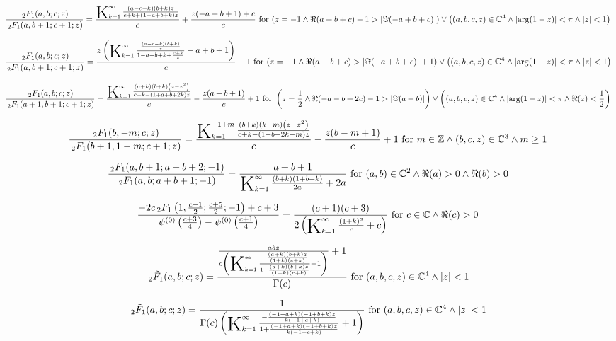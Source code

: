 \documentclass{article}
\newcommand{\bigK}{\mathop{\raisebox{-5pt}{\huge K}}}
\begin{document}
\[\frac{\, _2F_1(a,b;c;z)}{\, _2F_1(a,b+1;c+1;z)}=\frac{\bigK_{k=1}^{\infty}\frac{(a-c-k) (b+k) z}{c+k+(1-a+b+k) z}}{c}+\frac{z (-a+b+1)+c}{c}\text{ for }(z=-1\land \Re(a+b+c)-1>\left| \Im(-a+b+c)\right| )\lor \left((a,b,c,z)\in \mathbb{C}^4\land \left| \arg (1-z)\right| <\pi \land \left| z\right| <1\right)\] 

\[\frac{\, _2F_1(a,b;c;z)}{\, _2F_1(a,b+1;c+1;z)}=\frac{z \left(\bigK_{k=1}^{\infty}\frac{\frac{(a-c-k) (b+k)}{z}}{1-a+b+k+\frac{c+k}{z}}-a+b+1\right)}{c}+1\text{ for }(z=-1\land \Re(a-b+c)>\left| \Im(-a+b+c)\right| +1)\lor \left((a,b,c,z)\in \mathbb{C}^4\land \left| \arg (1-z)\right| <\pi \land \left| z\right| <1\right)\] 

\[\frac{\, _2F_1(a,b;c;z)}{\, _2F_1(a+1,b+1;c+1;z)}=\frac{\bigK_{k=1}^{\infty}\frac{(a+k) (b+k) \left(z-z^2\right)}{c+k-(1+a+b+2 k) z}}{c}-\frac{z (a+b+1)}{c}+1\text{ for }\left(z=\frac{1}{2}\land \Re(-a-b+2 c)-1>\left| \Im(a+b)\right| \right)\lor \left((a,b,c,z)\in \mathbb{C}^4\land \left| \arg (1-z)\right| <\pi \land \Re(z)<\frac{1}{2}\right)\] 

\[\frac{\, _2F_1(b,-m;c;z)}{\, _2F_1(b+1,1-m;c+1;z)}=\frac{\bigK_{k=1}^{-1+m}\frac{(b+k) (k-m) \left(z-z^2\right)}{c+k-(1+b+2 k-m) z}}{c}-\frac{z (b-m+1)}{c}+1\text{ for }m\in \mathbb{Z}\land (b,c,z)\in \mathbb{C}^3\land m\geq 1\] 

\[\frac{\, _2F_1(a,b+1;a+b+2;-1)}{\, _2F_1(a,b;a+b+1;-1)}=\frac{a+b+1}{\bigK_{k=1}^{\infty}\frac{(b+k) (1+b+k)}{2 a}+2 a}\text{ for }(a,b)\in \mathbb{C}^2\land \Re(a)>0\land \Re(b)>0\] 

\[\frac{-2 c \, _2F_1\left(1,\frac{c+1}{2};\frac{c+5}{2};-1\right)+c+3}{\psi ^{(0)}\left(\frac{c+3}{4}\right)-\psi ^{(0)}\left(\frac{c+1}{4}\right)}=\frac{(c+1) (c+3)}{2 \left(\bigK_{k=1}^{\infty}\frac{(1+k)^2}{c}+c\right)}\text{ for }c\in \mathbb{C}\land \Re(c)>0\] 

\[\, _2\tilde{F}_1(a,b;c;z)=\frac{\frac{a b z}{c \left(\bigK_{k=1}^{\infty}\frac{-\frac{(a+k) (b+k) z}{(1+k) (c+k)}}{1+\frac{(a+k) (b+k) z}{(1+k) (c+k)}}+1\right)}+1}{\Gamma (c)}\text{ for }(a,b,c,z)\in \mathbb{C}^4\land \left| z\right| <1\] 

\[\, _2\tilde{F}_1(a,b;c;z)=\frac{1}{\Gamma (c) \left(\bigK_{k=1}^{\infty}\frac{-\frac{(-1+a+k) (-1+b+k) z}{k (-1+c+k)}}{1+\frac{(-1+a+k) (-1+b+k) z}{k (-1+c+k)}}+1\right)}\text{ for }(a,b,c,z)\in \mathbb{C}^4\land \left| z\right| <1\] 
\end{document}
